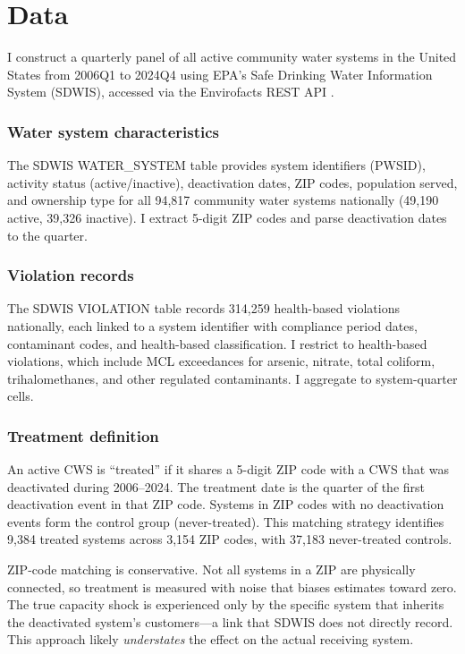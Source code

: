 \documentclass[12pt]{article}
\begin{document}
\section{Data}

I construct a quarterly panel of all active community water systems in the United States from 2006Q1 to 2024Q4 using EPA's Safe Drinking Water Information System (SDWIS), accessed via the Envirofacts REST API \citep{epa2023sdwis}.

\subsubsection*{Water system characteristics} The SDWIS WATER\_SYSTEM table provides system identifiers (PWSID), activity status (active/inactive), deactivation dates, ZIP codes, population served, and ownership type for all 94,817 community water systems nationally (49,190 active, 39,326 inactive). I extract 5-digit ZIP codes and parse deactivation dates to the quarter.

\subsubsection*{Violation records} The SDWIS VIOLATION table records 314,259 health-based violations nationally, each linked to a system identifier with compliance period dates, contaminant codes, and health-based classification. I restrict to health-based violations, which include MCL exceedances for arsenic, nitrate, total coliform, trihalomethanes, and other regulated contaminants. I aggregate to system-quarter cells.

\subsubsection*{Treatment definition} An active CWS is ``treated'' if it shares a 5-digit ZIP code with a CWS that was deactivated during 2006--2024. The treatment date is the quarter of the first deactivation event in that ZIP code. Systems in ZIP codes with no deactivation events form the control group (never-treated). This matching strategy identifies 9,384 treated systems across 3,154 ZIP codes, with 37,183 never-treated controls.

ZIP-code matching is conservative. Not all systems in a ZIP are physically connected, so treatment is measured with noise that biases estimates toward zero. The true capacity shock is experienced only by the specific system that inherits the deactivated system's customers---a link that SDWIS does not directly record. This approach likely \textit{understates} the effect on the actual receiving system.
\end{document}
